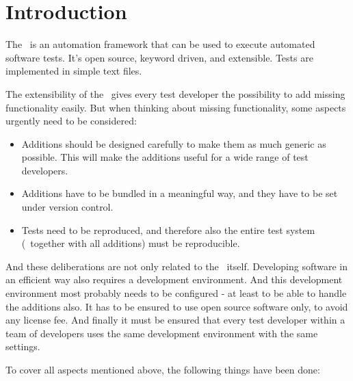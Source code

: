 %
%
%

\chapter{Introduction}

The \rfwcore\ is an automation framework that can be used to execute automated software tests. It's open source, keyword driven, and extensible.
Tests are implemented in simple text files.

The extensibility of the \rfwcore\ gives every test developer the possibility to add missing functionality easily. But when thinking about missing
functionality, some aspects urgently need to be considered:

\begin{itemize}
   \item Additions should be designed carefully to make them as much generic as possible. This will make the additions useful for a wide range of test developers.
   \item Additions have to be bundled in a meaningful way, and they have to be set under version control.
   \item Tests need to be reproduced, and therefore also the entire test system (\rfwcore\ together with all additions) must be reproducible.
\end{itemize}

And these deliberations are not only related to the \rfwcore\ itself. Developing software in an efficient way also requires a development environment.
And this development environment most probably needs to be configured - at least to be able to handle the additions also.
It has to be ensured to use open source software only, to avoid any license fee.
And finally it must be ensured that every test developer within a team of developers uses the same development environment with the same settings.

To cover all aspects mentioned above, the following things have been done:

